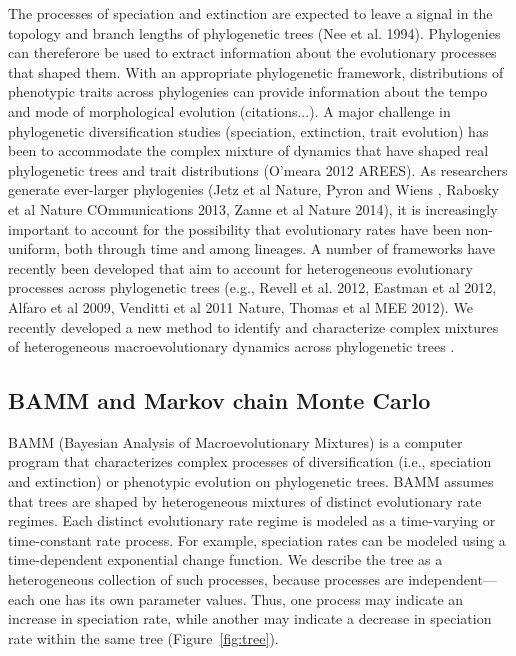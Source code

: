 \documentclass[12pt]{article}
\begin{document}
The processes of speciation and extinction are expected to leave a signal in the topology and branch lengths of 
phylogenetic trees (Nee et al. 1994). Phylogenies can thereferore be used to extract information about the 
evolutionary processes that shaped them. With an appropriate phylogenetic framework, 
distributions of phenotypic traits across phylogenies can provide information about the tempo and mode of morphological
evolution (citations...). A major challenge in phylogenetic diversification studies (speciation, extinction, trait evolution) 
has been to accommodate the complex mixture of dynamics that have shaped real phylogenetic trees 
and trait distributions (O'meara 2012 AREES). 
%
As researchers generate ever-larger phylogenies (Jetz et al Nature, Pyron and Wiens
, Rabosky et al Nature COmmunications 2013, Zanne et al Nature 2014), it is increasingly important
to account for the possibility that evolutionary rates have been non-uniform, both through time and among 
lineages. A number of frameworks have recently been developed that aim to account for heterogeneous 
evolutionary processes across phylogenetic trees (e.g., Revell et al. 2012, Eastman et al 2012, Alfaro et al 2009, Venditti et al 2011 Nature, Thomas et al MEE 2012).   
%
We recently developed a new method to identify and characterize
complex mixtures of heterogeneous macroevolutionary dynamics 
across phylogenetic trees \citep{rab14plos}.




\subsection*{BAMM and Markov chain Monte Carlo}

BAMM (Bayesian Analysis of Macroevolutionary Mixtures)
is a computer program that characterizes complex processes of
diversification (i.e., speciation and extinction)
or phenotypic evolution on phylogenetic trees.
%
BAMM assumes that trees are shaped by heterogeneous mixtures
of distinct evolutionary rate regimes.
%
Each distinct evolutionary rate regime is modeled as a time-varying or 
time-constant rate process. For example, speciation rates can
be modeled using a time-dependent exponential change function.
%
We describe the tree as a heterogeneous collection of 
such processes, because processes
are independent---each one has its own parameter values.
%
Thus, one process may indicate an increase in speciation rate,
while another may indicate a decrease in speciation rate
within the same tree (Figure~\ref{fig:tree}).
\end{document}
